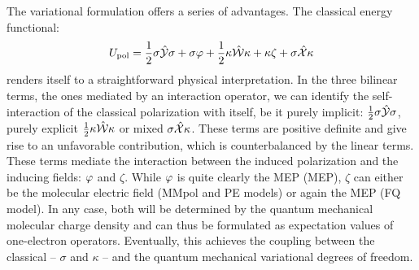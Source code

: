 The variational formulation offers a series of advantages.
The classical energy functional:
\begin{equation}
  U_\mathrm{pol} =
   \frac{1}{2}\sigma\hat{\mathcal{Y}}\sigma + \sigma\varphi
 + \frac{1}{2}\kappa\hat{\mathcal{W}}\kappa + \kappa\zeta
 + \sigma\hat{\mathcal{X}}\kappa
\end{equation}
renders itself to a straightforward physical interpretation. In the
three bilinear terms, \ie{} the ones mediated by an interaction
operator, we can identify the self-interaction of the classical
polarization with itself, be it purely implicit:
$\frac{1}{2}\sigma\hat{\mathcal{Y}}\sigma$, purely explicit
$\frac{1}{2}\kappa\hat{\mathcal{W}}\kappa$ or mixed $\sigma\hat{\mathcal{X}}\kappa$.
These terms are positive definite and give rise to an unfavorable
contribution, which is counterbalanced by the linear terms. These terms
mediate the interaction between the induced polarization and the
inducing fields: $\varphi$ and $\zeta$. While $\varphi$ is quite clearly the
\acl{MEP} (\acs{MEP}), $\zeta$ can either be the molecular electric
field (MMpol and \acs{PE} models) or again the \acs{MEP} (\acs{FQ} model).
In any case, both will be determined by the quantum mechanical molecular
charge density and can thus be formulated as expectation values of
one-electron operators. Eventually, this achieves the coupling between
the classical -- $\sigma$ and $\kappa$ -- and
the quantum mechanical variational degrees of freedom.

